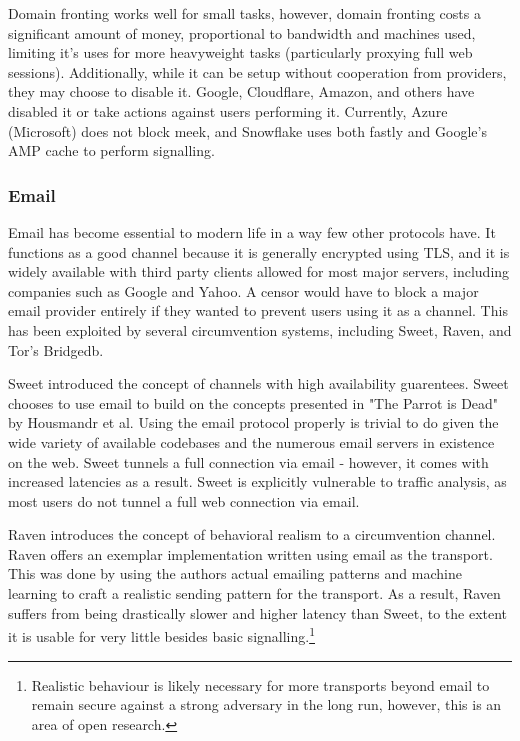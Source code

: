\documentclass[12pt]{report}
\begin{document}
Domain fronting works well for small tasks, however, domain fronting costs a significant amount of money, proportional to bandwidth and machines used, limiting it's uses for more heavyweight tasks (particularly proxying full web sessions). Additionally, while it can be setup without cooperation from providers, they may choose to disable it. Google, Cloudflare, Amazon, and others have disabled it or take actions against users performing it. Currently, Azure (Microsoft) does not block meek, and Snowflake uses both fastly and Google's AMP cache to perform signalling.

\subsubsection{Email}

Email has become essential to modern life in a way few other protocols have. It functions as a good channel because it is generally encrypted using TLS, and it is widely available with third party clients allowed for most major servers, including companies such as Google and Yahoo. A censor would have to block a major email provider entirely if they wanted to prevent users using it as a channel. This has been exploited by several circumvention systems, including Sweet, Raven, and Tor's Bridgedb.

Sweet introduced the concept of channels with high availability guarentees. Sweet chooses to use email to build on the concepts presented in "The Parrot is Dead" by Housmandr et al.\cite{parrot} Using the email protocol properly is trivial to do given the wide variety of available codebases and the numerous email servers in existence on the web. Sweet tunnels a full connection via email - however, it comes with increased latencies as a result. Sweet is explicitly vulnerable to traffic analysis, as most users do not tunnel a full web connection via email.\cite{sweet}

Raven introduces the concept of behavioral realism to a circumvention channel. Raven offers an exemplar implementation written using email as the transport. This was done by using the authors actual emailing patterns and machine learning to craft a realistic sending pattern for the transport. As a result, Raven suffers from being drastically slower and higher latency than Sweet, to the extent it is usable for very little besides basic signalling.\footnote{Realistic behaviour is likely necessary for more transports beyond email to remain secure against a strong adversary in the long run, however, this is an area of open research.}\cite{raven}
\end{document}
